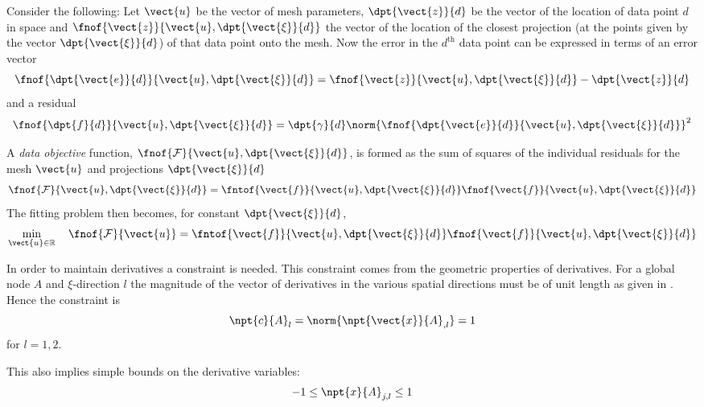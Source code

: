 Consider the following: Let $\vect{u}$ be the vector of mesh parameters,
$\dpt{\vect{z}}{d}$ be the vector of the location of data point $d$ in space
and $\fnof{\vect{z}}{\vect{u},\dpt{\vect{\xi}}{d}}$ the vector of the location
of the closest projection (at the points given by the vector
$\dpt{\vect{\xi}}{d}$) of that data point onto the mesh. Now the error in the
$d^{\text{th}}$ data point can be expressed in terms of an error vector
\begin{equation}
  \fnof{\dpt{\vect{e}}{d}}{\vect{u},\dpt{\vect{\xi}}{d}}=\fnof{\vect{z}}
  {\vect{u},\dpt{\vect{\xi}}{d}}-\dpt{\vect{z}}{d}
  \label{eqn:errorvector}
\end{equation}
and a residual
\begin{equation}
  \fnof{\dpt{f}{d}}{\vect{u},\dpt{\vect{\xi}}{d}}=\dpt{\gamma}{d}\norm{\fnof{
      \dpt{\vect{e}}{d}}{\vect{u},\dpt{\vect{\xi}}{d}}}^{2}
  \label{eqn:dataresidual}
\end{equation}

A \emph{data objective} function,
$\fnof{\mathcal{F}}{\vect{u},\dpt{\vect{\xi}}{d}}$, is formed as the sum of
squares of the individual residuals for the mesh $\vect{u}$ and projections
$\dpt{\vect{\xi}}{d}$
\begin{equation}
  \fnof{\mathcal{F}}{\vect{u},\dpt{\vect{\xi}}{d}}=\fntof{\vect{f}}{\vect{u},
    \dpt{\vect{\xi}}{d}}\fnof{\vect{f}}{\vect{u},\dpt{\vect{\xi}}{d}}
  \label{eqn:nldataresidualfn}
\end{equation}
The fitting problem then becomes, for constant $\dpt{\vect{\xi}}{d}$,
\begin{equation}
  \min_{\vect{u} \in \mathbb{R}} \quad \fnof{\mathcal{F}}{\vect{u}}=\fntof{\vect{f}}
  {\vect{u},\dpt{\vect{\xi}}{d}}\fnof{\vect{f}}{\vect{u},\dpt{\vect{\xi}}{d}}
\end{equation}

In order to maintain \arclen derivatives a \nonlin constraint is needed.  This
constraint comes from the geometric properties of \arclen derivatives.  For a
global node $A$ and $\xi$-direction $l$ the magnitude of the vector of \arclen
derivatives in the various spatial directions must be of unit length as
given in .  Hence the constraint is
\begin{equation}
  \npt{c}{A}_{l}=\norm{\npt{\vect{x}}{A}_{,l}}=1
  \label{eqn:normconstraint}
\end{equation}
for $l=1,2$.

This also implies simple bounds on the derivative variables:
\begin{equation}
  -1 \leq \npt{x}{A}_{j,l} \leq 1
\end{equation}


